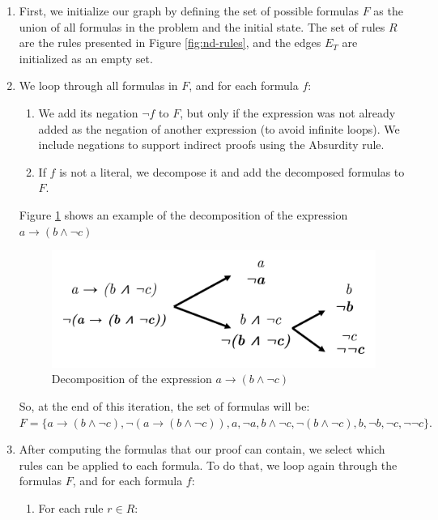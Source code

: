 \begin{enumerate}
    \item First, we initialize our graph by defining the set of possible formulas \(F\) as the union of all formulas in the problem and the initial state. The set of rules \(R\) are the rules presented in Figure \ref{fig:nd-rules}, and the edges \(E_T\) are initialized as an empty set.

    \item We loop through all formulas in \(F\), and for each formula \(f\):

    \begin{enumerate}
         \item We add its negation \(\lnot f\) to \(F\), but only if the expression was not already added as the negation of another expression (to avoid infinite loops). We include negations to support indirect proofs using the Absurdity rule.
         \item If \(f\) is not a literal, we decompose it and add the decomposed formulas to \(F\).
    \end{enumerate}

    Figure \ref{fig:tg-exps} shows an example of the decomposition of the expression \(a \to ( b \land \lnot c)\) 
    \begin{figure}
        \centering
        \includegraphics[width=0.6\linewidth]{resources/decomposition.jpg}
        \caption{Decomposition of the expression \(a \to ( b \land \lnot c)\)}
        \label{fig:tg-exps}
    \end{figure}

    So, at the end of this iteration, the set of formulas will be: \(
    F = \{ a \to ( b \land \lnot c), \lnot(a \to ( b \land \lnot c)), a, \lnot a, b \land \lnot c, \lnot(b \land \lnot c), b, \lnot b, \lnot c, \lnot\lnot c \}.
    \)

    \item After computing the formulas that our proof can contain, we select which rules can be applied to each formula. To do that, we loop again through the formulas \(F\), and for each formula \(f\):

       \begin{enumerate}
            \item For each rule \(r \in R\):


\end{enumerate}
\end{enumerate}
